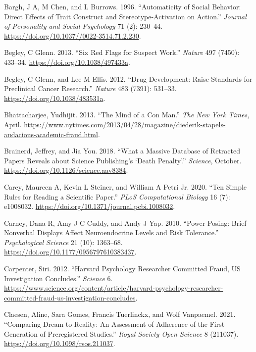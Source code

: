 \documentclass[
  letterpaper,
  DIV=11,
  numbers=noendperiod]{scrartcl}
\newlength{\cslhangindent}
\newenvironment{CSLReferences}[2] %
 {\begin{list}{}{%
  \setlength{\itemindent}{0pt}
  \setlength{\leftmargin}{0pt}
  \setlength{\parsep}{0pt}
  \ifodd #1
   \setlength{\leftmargin}{\cslhangindent}
   \setlength{\itemindent}{-1\cslhangindent}
  \fi
  \setlength{\itemsep}{#2\baselineskip}}}
 {\end{list}}
\begin{document}
\label{refs}
\begin{CSLReferences}{1}{0}
Bargh, J A, M Chen, and L Burrows. 1996. {``Automaticity of Social
Behavior: Direct Effects of Trait Construct and Stereotype-Activation on
Action.''} \emph{Journal of Personality and Social Psychology} 71 (2):
230--44. \url{https://doi.org/10.1037//0022-3514.71.2.230}.

Begley, C Glenn. 2013. {``Six Red Flags for Suspect Work.''}
\emph{Nature} 497 (7450): 433--34.
\url{https://doi.org/10.1038/497433a}.

Begley, C Glenn, and Lee M Ellis. 2012. {``Drug Development: Raise
Standards for Preclinical Cancer Research.''} \emph{Nature} 483 (7391):
531--33. \url{https://doi.org/10.1038/483531a}.

Bhattacharjee, Yudhijit. 2013. {``The Mind of a Con Man.''} \emph{The
New York Times}, April.
\url{https://www.nytimes.com/2013/04/28/magazine/diederik-stapels-audacious-academic-fraud.html}.

Brainerd, Jeffrey, and Jia You. 2018. {``What a Massive Database of
Retracted Papers Reveals about Science Publishing's {`Death
Penalty'}.''} \emph{Science}, October.
\url{https://doi.org/10.1126/science.aav8384}.

Carey, Maureen A, Kevin L Steiner, and William A Petri Jr. 2020. {``Ten
Simple Rules for Reading a Scientific Paper.''} \emph{PLoS
{C}omputational {B}iology} 16 (7): e1008032.
\url{https://doi.org/10.1371/journal.pcbi.1008032}.

Carney, Dana R, Amy J C Cuddy, and Andy J Yap. 2010. {``Power Posing:
Brief Nonverbal Displays Affect Neuroendocrine Levels and Risk
Tolerance.''} \emph{Psychological Science} 21 (10): 1363--68.
\url{https://doi.org/10.1177/0956797610383437}.

Carpenter, Siri. 2012. {``Harvard Psychology Researcher Committed Fraud,
{US} Investigation Concludes.''} \emph{Science} 6.
\url{https://www.science.org/content/article/harvard-psychology-researcher-committed-fraud-us-investigation-concludes}.

Claesen, Aline, Sara Gomes, Francis Tuerlinckx, and Wolf Vanpaemel.
2021. {``Comparing Dream to Reality: An Assessment of Adherence of the
First Generation of Preregistered Studies.''} \emph{Royal Society Open
Science} 8 (211037). \url{https://doi.org/10.1098/rsos.211037}.


\end{CSLReferences}
\end{document}
